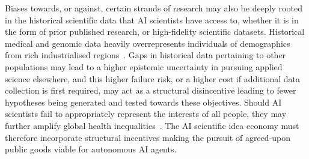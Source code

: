 \documentclass[11pt, a4paper, twocolumn, goog]{google}
\begin{document}
Biases towards, or against, certain strands of research may also be deeply rooted in the historical scientific data that AI scientists have access to, whether it is in the form of prior published research, or high-fidelity scientific datasets. Historical medical and genomic data heavily overrepresents individuals of demographics from rich industrialised regions~\citep{corpas2025bridging}. Gaps in historical data pertaining to other populations may lead to a higher epistemic uncertainty in pursuing applied science elsewhere, and this higher failure risk, or a higher cost if additional data collection is first required, may act as a structural disincentive leading to fewer hypotheses being generated and tested towards these objectives. Should AI scientists fail to appropriately represent the interests of all people, they may further amplify global health inequalities~\citep{ruger2006ethics, hosseinpoor2015promoting}. The AI scientific idea economy must therefore incorporate structural incentives making the pursuit of agreed-upon public goods viable for autonomous AI agents.
\end{document}
